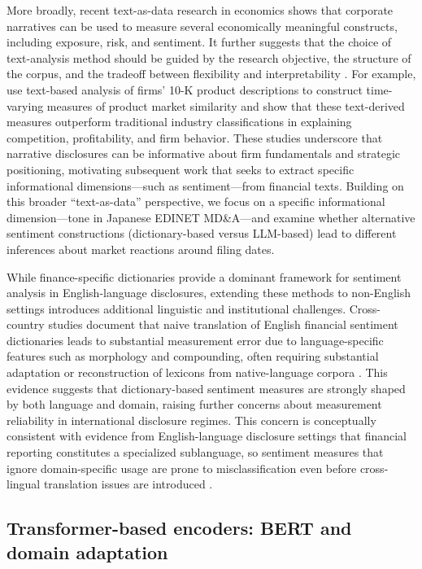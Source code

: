 More broadly, recent text-as-data research in economics shows that corporate narratives can be used to measure several economically meaningful constructs, including exposure, risk, and sentiment. It further suggests that the choice of text-analysis method should be guided by the research objective, the structure of the corpus, and the tradeoff between flexibility and interpretability \citep{hoberg2016text, hassan2025text}. For example, \citet{hoberg2016text} use text-based analysis of firms’ 10-K product descriptions to construct time-varying measures of product market similarity and show that these text-derived measures outperform traditional industry classifications in explaining competition, profitability, and firm behavior. These studies underscore that narrative disclosures can be informative about firm fundamentals and strategic positioning, motivating subsequent work that seeks to extract specific informational dimensions—such as sentiment—from financial texts. Building on this broader ``text-as-data'' perspective, we focus on a specific informational dimension—tone in Japanese EDINET MD\&A—and examine whether alternative sentiment constructions (dictionary-based versus LLM-based) lead to different inferences about market reactions around filing dates.

While finance-specific dictionaries provide a dominant framework for sentiment analysis in English-language disclosures, extending these methods to non-English settings introduces additional linguistic and institutional challenges. Cross-country studies document that naive translation of English financial sentiment dictionaries leads to substantial measurement error due to language-specific features such as morphology and compounding, often requiring substantial adaptation or reconstruction of lexicons from native-language corpora \citep{bannier2018german, du2022chinese, kim2021korean}. This evidence suggests that dictionary-based sentiment measures are strongly shaped by both language and domain, raising further concerns about measurement reliability in international disclosure regimes. This concern is conceptually consistent with evidence from English-language disclosure settings that financial reporting constitutes a specialized sublanguage, so sentiment measures that ignore domain-specific usage are prone to misclassification even before cross-lingual translation issues are introduced \citep{henry2016measuring}.

\subsection{Transformer-based encoders: BERT and domain adaptation}


